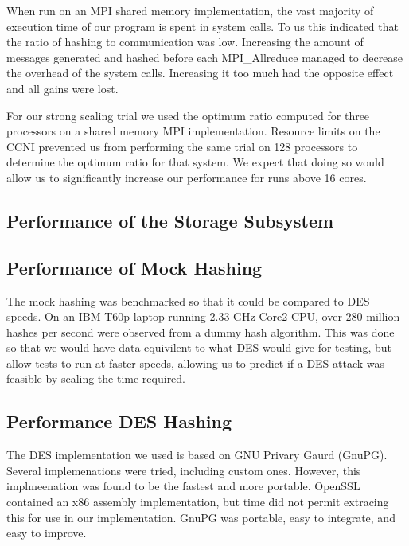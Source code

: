 When run on an MPI shared memory implementation, the vast majority of execution
time of our program is spent in system calls.  To us this indicated that the
ratio of hashing to communication was low.  Increasing the amount of messages
generated and hashed before each MPI\_Allreduce managed to decrease the overhead
of the system calls.  Increasing it too much had the opposite effect and all
gains were lost.

For our strong scaling trial we used the optimum ratio computed for three
processors on a shared memory MPI implementation.  Resource limits on the CCNI
prevented us from performing the same trial on 128 processors to determine the
optimum ratio for that system.  We expect that doing so would allow us to
significantly increase our performance for runs above 16 cores.

\subsection{Performance of the Storage Subsystem}


\subsection{Performance of Mock Hashing}
\label{sec::performance::mock}

The mock hashing was benchmarked so that it could be compared to DES speeds.
On an IBM T60p laptop running 2.33 GHz Core2 CPU, over 280 million hashes per
second were observed from
a dummy hash algorithm.  This was done so that we would have data equivilent
to what DES would give for testing, but allow tests to run at faster speeds,
allowing us to predict if a DES attack was feasible by scaling the time 
required.

\subsection{Performance DES Hashing}
\label{sec::performance::des}

The DES implementation we used is based on GNU Privary Gaurd (GnuPG).
Several implemenations were tried, including custom ones.  However,
this implmeenation was found to be the fastest and more portable.
OpenSSL contained an x86 assembly implementation, but time did not
permit extracing this for use in our implementation.  GnuPG was portable,
easy to integrate, and easy to improve.

